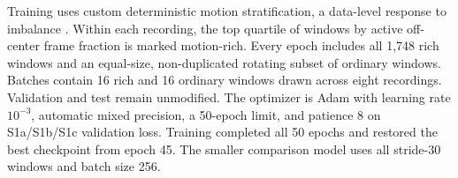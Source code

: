 Training uses custom deterministic motion stratification, a data-level response
to imbalance \cite{he2009imbalanced}. Within each recording, the
top quartile of windows by active off-center frame fraction is marked
motion-rich. Every epoch includes all 1,748 rich windows and an equal-size,
non-duplicated rotating subset of ordinary windows. Batches contain 16 rich and
16 ordinary windows drawn across eight recordings. Validation and test remain
unmodified. The optimizer is Adam with learning rate \(10^{-3}\), automatic
mixed precision, a 50-epoch limit, and patience 8 on S1a/S1b/S1c validation
loss. Training completed all 50 epochs and restored the best checkpoint from
epoch 45. The smaller comparison model uses all stride-30 windows and batch
size 256.
